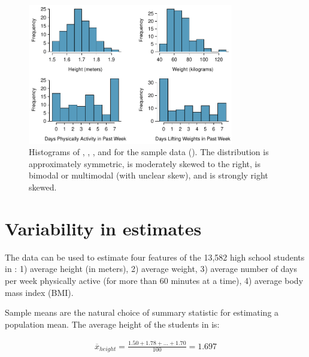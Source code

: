 \begin{spacing}{1.5}
\begin{figure}
\centering
\includegraphics[width=0.8\textwidth]
{ch_inference_foundations_oi_biostat/figures/yrbssSampHistograms/yrbssSampHistograms} 
\caption{Histograms of , , , and  for the sample data (). The  distribution is approximately symmetric,  is moderately skewed to the right,  is bimodal or multimodal (with unclear skew), and  is strongly right skewed.}
\label{yrbssSampHistograms}
\end{figure}

\section[Variability in estimates]{Variability in estimates} %
\label{variabilityInEstimates}


The  data can be used to estimate four features of the 13,582 high school students in : 1) average height (in meters), 2) average weight, 3) average number of days per week physically active (for more than 60 minutes at a time), 4) average body mass index (BMI).

Sample means are the natural choice of summary statistic for estimating a population mean. The average height of the students in  is:

\begin{align*}
\overline{x}_{height} = \frac{1.50 + 1.78 + \dots + 1.70}{100} = 1.697
\end{align*}


\end{spacing}
